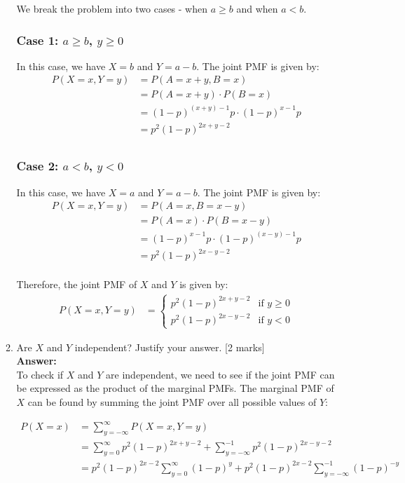 \documentclass[12pt]{article}
\begin{document}
\begin{enumerate}
\begin{enumerate}
We break the problem into two cases - when $a\geq b$ and when $a<b$.

\subsubsection*{Case 1: $a\geq b$, $y \geq 0$}

In this case, we have $X = b$ and $Y = a-b$. The joint PMF is given by:
\begin{align*}
P(X=x, Y=y) &= P(A = x + y, B=x) \\
&= P(A = x+y) \cdot P(B=x) \\
&= (1-p)^{(x+y)-1}p \cdot (1-p)^{x-1}p \\
&= \boxed{p^2(1-p)^{2x+y-2}} \\
\end{align*}

\subsubsection*{Case 2: $a<b$, $y < 0$}
In this case, we have $X = a$ and $Y = a-b$. The joint PMF is given by:
\begin{align*}
P(X=x, Y=y) &= P(A = x, B=x-y) \\
&= P(A = x) \cdot P(B=x-y) \\
&= (1-p)^{x-1}p \cdot (1-p)^{(x-y)-1}p \\
&= \boxed{p^2(1-p)^{2x-y-2}} \\
\end{align*}

Therefore, the joint PMF of $X$ and $Y$ is given by:
\begin{align*}
P(X=x, Y=y) &= \begin{cases}
p^2(1-p)^{2x+y-2} & \text{if } y \geq 0 \\
p^2(1-p)^{2x-y-2} & \text{if } y < 0
\end{cases}
\end{align*}


\item Are $X$ and $Y$ independent? Justify your answer.  
			\hfill [2 marks]
%
\\
\textbf{Answer:}
\\
To check if $X$ and $Y$ are independent, we need to see if the joint PMF can be expressed as the product of the marginal PMFs.
The marginal PMF of $X$ can be found by summing the joint PMF over all possible values of $Y$:

\begin{align*}
P(X=x) &= \sum_{y=-\infty}^{\infty} P(X=x, Y=y) \\
&= \sum_{y=0}^{\infty} p^2(1-p)^{2x+y-2} + \sum_{y=-\infty}^{-1} p^2(1-p)^{2x-y-2} \\
&= p^2(1-p)^{2x-2} \sum_{y=0}^{\infty} (1-p)^{y} + p^2(1-p)^{2x-2} \sum_{y=-\infty}^{-1} (1-p)^{-y} \\
\end{align*}


\end{enumerate}
\end{enumerate}
\end{document}
